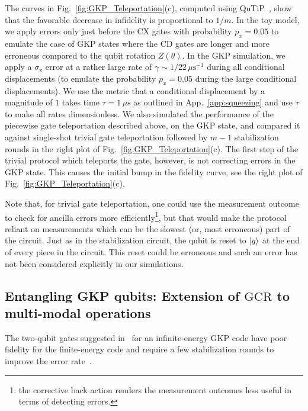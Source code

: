 \documentclass[aps,prx,showpacs,notitlepage,twocolumn,superscriptaddress,nofootinbib,preprintnumbers,floatfix,10pt, longbibliography]{revtex4-2}
\begin{document}
 The curves in Fig.~\ref{fig:GKP_Teleportation}(c), computed using QuTiP~\cite{Johansson2013}, show that the favorable decrease in infidelity is proportional to $1/m$. In the toy model, we apply errors only just before the $\mathrm{CX}$ gates with probability $p_x=0.05$ to emulate the case of GKP states where the $\mathrm{CD}$ gates are longer and more erroneous compared to the qubit rotation $Z(\theta)$. In the GKP simulation, we apply a $\sigma_\mathrm{x}$ error at a rather large rate of $\gamma\sim 1/22\,\mu\textrm{s}^{-1}$ during all conditional displacements (to emulate the probability $p_x=0.05$ during the large conditional displacements). We use the metric that a conditional displacement by a magnitude of $1$ takes time $\tau=1\,\mu\textrm{s}$ as outlined in App.~\ref{app:squeezing} and use $\tau$ to make all rates dimensionless. We also simulated the performance of the piecewise gate teleportation described above, on the GKP state, and compared it against single-shot trivial gate teleportation followed by $m-1$ stabilization rounds in the right plot of Fig.~\ref{fig:GKP_Teleportation}(c). The first step of the trivial protocol which teleports the gate, however, is not correcting errors in the GKP state. This causes the initial bump in the fidelity curve, see the right plot of Fig.~\ref{fig:GKP_Teleportation}(c). 
 
 Note that, for trivial gate teleportation, one could use the measurement outcome to check for ancilla errors more efficiently\footnote{the corrective back action renders the measurement outcomes less useful in terms of detecting errors.}, but that would make the protocol reliant on measurements which can be the slowest (or, most erroneous) part of the circuit. Just as in the stabilization circuit, the qubit is reset to $\ket{g}$ at the end of every piece in the circuit. This reset could be erroneous and such an error has not been considered explicitly in our simulations. 

\subsection{Entangling GKP qubits: Extension of $\mathrm{GCR}$ to multi-modal operations}
The two-qubit gates suggested in~\cite{gottesman2001encoding} for an infinite-energy GKP code have poor fidelity for the finite-energy code and require a few stabilization rounds to improve the error rate~\cite{rojkov2023two}. 
\end{document}

